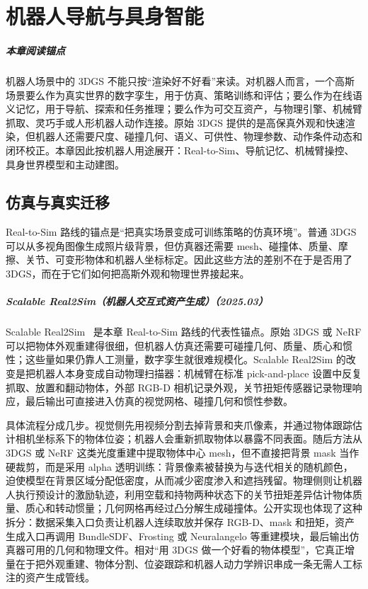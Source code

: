 \chapter{机器人导航与具身智能}

\paragraph*{本章阅读锚点}
机器人场景中的 3DGS 不能只按“渲染好不好看”来读。对机器人而言，一个高斯场景要么作为真实世界的数字孪生，用于仿真、策略训练和评估；要么作为在线语义记忆，用于导航、探索和任务推理；要么作为可交互资产，与物理引擎、机械臂抓取、灵巧手或人形机器人动作连接。原始 3DGS 提供的是高保真外观和快速渲染，但机器人还需要尺度、碰撞几何、语义、可供性、物理参数、动作条件动态和闭环校正。本章因此按机器人用途展开：Real-to-Sim、导航记忆、机械臂操控、具身世界模型和主动建图。

\section{仿真与真实迁移}

Real-to-Sim 路线的锚点是“把真实场景变成可训练策略的仿真环境”。普通 3DGS 可以从多视角图像生成照片级背景，但仿真器还需要 mesh、碰撞体、质量、摩擦、关节、可变形物体和机器人坐标标定。因此这些方法的差别不在于是否用了 3DGS，而在于它们如何把高斯外观和物理世界接起来。



\paragraph{Scalable Real2Sim（机器人交互式资产生成）（2025.03）}
Scalable Real2Sim~\cite{2503_00370} 是本章 Real-to-Sim 路线的代表性锚点。原始 3DGS 或 NeRF 可以把物体外观重建得很细，但机器人仿真还需要可碰撞几何、质量、质心和惯性；这些量如果仍靠人工测量，数字孪生就很难规模化。Scalable Real2Sim 的改变是把机器人本身变成自动物理扫描器：机械臂在标准 pick-and-place 设置中反复抓取、放置和翻动物体，外部 RGB-D 相机记录外观，关节扭矩传感器记录物理响应，最后输出可直接进入仿真的视觉网格、碰撞几何和惯性参数。

具体流程分成几步。视觉侧先用视频分割去掉背景和夹爪像素，并通过物体跟踪估计相机坐标系下的物体位姿；机器人会重新抓取物体以暴露不同表面。随后方法从 3DGS 或 NeRF 这类光度重建中提取物体中心 mesh，但不直接把背景 mask 当作硬裁剪，而是采用 alpha 透明训练：背景像素被替换为与迭代相关的随机颜色，迫使模型在背景区域分配低密度，从而减少密度渗入和遮挡残留。物理侧则让机器人执行预设计的激励轨迹，利用空载和持物两种状态下的关节扭矩差异估计物体质量、质心和转动惯量；几何网格再经过凸分解生成碰撞体。公开实现也体现了这种拆分：数据采集入口负责让机器人连续取放并保存 RGB-D、mask 和扭矩，资产生成入口再调用 BundleSDF、Frosting 或 Neuralangelo 等重建模块，最后输出仿真器可用的几何和物理文件。相对“用 3DGS 做一个好看的物体模型”，它真正增量在于把外观重建、物体分割、位姿跟踪和机器人动力学辨识串成一条无需人工标注的资产生成管线。

